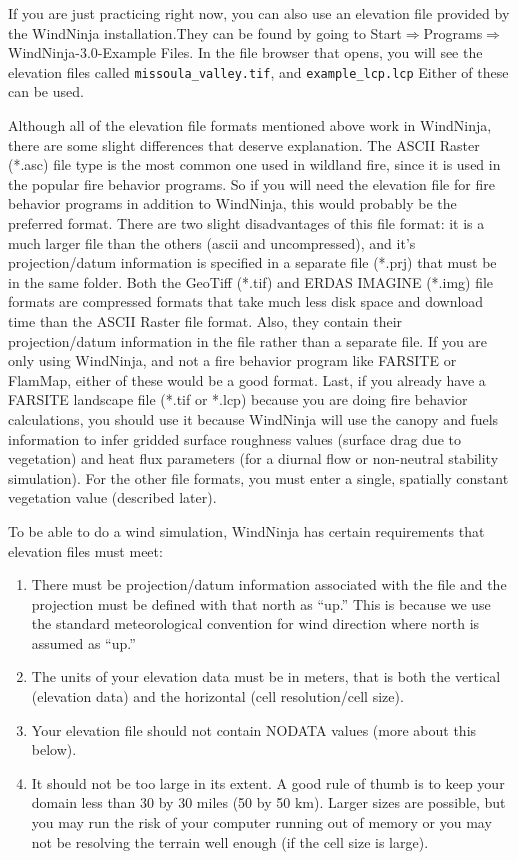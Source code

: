 \documentclass[12pt]{article}
\begin{document}
If you are just practicing right now, you can also use an elevation file provided by the WindNinja installation.They can be found by going to Start$\Rightarrow$Programs$\Rightarrow$WindNinja-3.0-Example Files.  
In the file browser that opens, you will see the elevation files called \texttt{missoula\_valley.tif}, and \texttt{example\_lcp.lcp} Either of these can be used.

Although all of the elevation file formats mentioned above work in WindNinja, there are some slight differences that deserve explanation.  The ASCII Raster (*.asc) file type is the most common one used in wildland fire, since it is used in the popular fire behavior programs.  So if you will need the elevation file for fire behavior programs in addition to WindNinja, this would probably be the preferred format.  There are two slight disadvantages of this file format: it is a much larger file than the others (ascii and uncompressed), and it's projection/datum information is specified in a separate file (*.prj) that must be in the same folder.  Both the GeoTiff (*.tif) and ERDAS IMAGINE (*.img) file formats are compressed formats that take much less disk space and download time than the ASCII Raster file format.  Also, they contain their projection/datum information in the file rather than a separate file.  If you are only using WindNinja, and not a fire behavior program like FARSITE or FlamMap, either of these would be a good format.  Last, if you already have a FARSITE landscape file (*.tif or *.lcp) because you are doing fire behavior calculations, you should use it because WindNinja will use the canopy and fuels information to infer gridded surface roughness values (surface drag due to vegetation) and heat flux parameters (for a diurnal flow or non-neutral stability simulation).  For the other file formats, you must enter a single, spatially constant vegetation value (described later).

To be able to do a wind simulation, WindNinja has certain requirements that elevation files must meet:
\begin{enumerate}
\item There must be projection/datum information associated with the file and the projection must be defined with that north as ``up.'' This is because we use the standard meteorological convention for wind direction where north is assumed as ``up.''
\item The units of your elevation data must be in meters, that is both the vertical (elevation data) and the horizontal (cell resolution/cell size).
\item Your elevation file should not contain NODATA values (more about this below).
\item It should not be too large in its extent.  A good rule of thumb is to keep your domain less than 30 by 30 miles (50 by 50 km).  Larger sizes are possible, but you may run the risk of your computer running out of memory or you may not be resolving the terrain well enough (if the cell size is large).
\end{enumerate}
\end{document}
